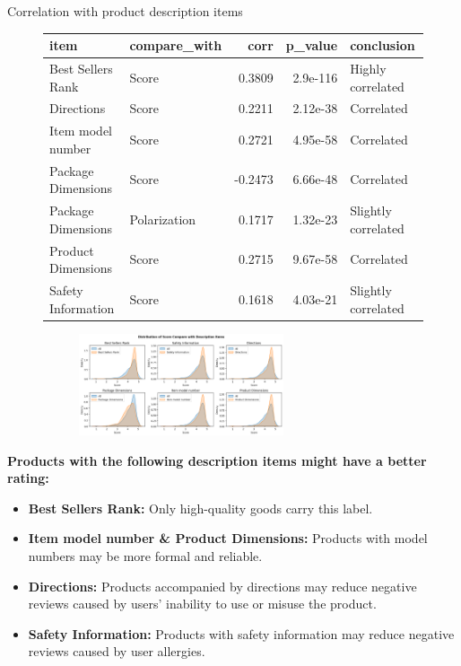 \begin{frame}{Correlation with product description items}
	\vspace{-16pt}
	\begin{figure}[htbp]
		\centering
		\begin{minipage}[t]{0.50\textwidth}
			\vspace{8pt}
			\centering
			\tiny
			\begin{tabular}{llrrl}
				\toprule
				item & compare\_with & corr & p\_value & conclusion \\
				\midrule
				Best Sellers Rank & Score & 0.3809 & 2.9e-116 & Highly correlated \\
				Directions & Score & 0.2211 & 2.12e-38 & Correlated \\
				Item model number & Score & 0.2721 & 4.95e-58 & Correlated \\
				Package Dimensions & Score & -0.2473 & 6.66e-48 & Correlated \\
				Package Dimensions & Polarization & 0.1717 & 1.32e-23 & Slightly correlated \\
				Product Dimensions & Score & 0.2715 & 9.67e-58 & Correlated \\
				Safety Information & Score & 0.1618 & 4.03e-21 & Slightly correlated \\
				\bottomrule
			\end{tabular}
			\normalsize
		\end{minipage}
		\hfill
		\begin{minipage}[t]{0.40\textwidth}
			\vspace{0pt}
			\centering
			\begin{figure}
				\centering
					\includegraphics[height=3cm]{pic/corr_desc_item_dist.png}
			\end{figure}
		\end{minipage}
	\end{figure}

	\footnotesize
	\textbf{Products with the following description items might have a better rating:}
	\scriptsize
	\begin{itemize}
		\item \textbf{Best Sellers Rank:} Only high-quality goods carry this label.
		\item \textbf{Item model number \& Product Dimensions:} Products with model numbers may be more formal and reliable.
		\item \textbf{Directions:} Products accompanied by directions may reduce negative reviews caused by users' inability to use or misuse the product.
		\item \textbf{Safety Information:} Products with safety information may reduce negative reviews caused by user allergies.
	\end{itemize}
	\normalsize


\end{frame}
